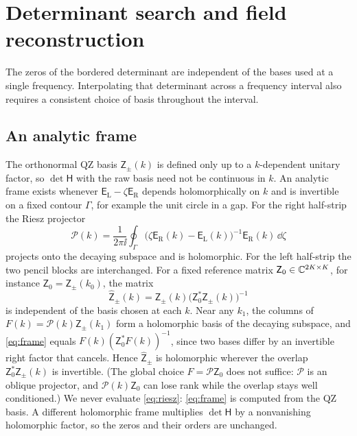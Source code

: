\section{Determinant search and field reconstruction}\label{sec:algorithm}
The zeros of the bordered determinant are independent of the bases used
at a single frequency. Interpolating that determinant across a frequency
interval also requires a consistent choice of basis throughout the interval.
\subsection{An analytic frame}\label{sec:frame}
The orthonormal QZ basis $\mathsf Z_\pm(k)$ is defined only up to a
$k$-dependent unitary factor, so $\det\mathsf H$ with the raw basis need not be
continuous in $k$. An analytic frame exists whenever $\mathsf E_{\mathrm L}-\zeta\mathsf E_{\mathrm R}$
depends holomorphically on $k$ and is invertible on a fixed contour $\Gamma$, for
example the unit circle in a gap. For the right half-strip the Riesz projector
\begin{equation}\label{eq:riesz}
  \mathscr P(k)=\frac1{2\pi\ii}\oint_\Gamma\bigl(\zeta\mathsf E_{\mathrm R}(k)-\mathsf E_{\mathrm L}(k)\bigr)^{-1}
  \mathsf E_{\mathrm R}(k)\,\dd\zeta
\end{equation}
projects onto the decaying subspace and is holomorphic. For the left half-strip the two pencil blocks are interchanged. For a fixed
reference matrix $\mathsf Z_0\in\mathbb{C}^{2K\times K}$, for instance
$\mathsf Z_0=\mathsf Z_\pm(k_0)$, the matrix
\begin{equation}\label{eq:frame}
  \widehat{\mathsf Z}_\pm(k)=\mathsf Z_\pm(k)\bigl(\mathsf Z_0^*\mathsf Z_\pm(k)\bigr)^{-1}
\end{equation}
is independent of the basis chosen at each $k$. Near any $k_1$, the columns
of $F(k)=\mathscr P(k)\mathsf Z_\pm(k_1)$ form a holomorphic basis of the
decaying subspace, and \eqref{eq:frame} equals $F(k)(\mathsf Z_0^*F(k))^{-1}$,
since two bases differ by an invertible right factor that cancels. Hence
$\widehat{\mathsf Z}_\pm$ is holomorphic wherever the overlap $\mathsf Z_0^*\mathsf Z_\pm(k)$
is invertible. (The global choice $F=\mathscr P\mathsf Z_0$ does not suffice:
$\mathscr P$ is an oblique projector, and $\mathscr P(k)\mathsf Z_0$ can lose rank
while the overlap stays well conditioned.) We never evaluate \eqref{eq:riesz}:
\eqref{eq:frame} is computed from the QZ basis. A different holomorphic frame
multiplies $\det\mathsf H$ by a nonvanishing holomorphic factor, so the zeros and
their orders are unchanged.

